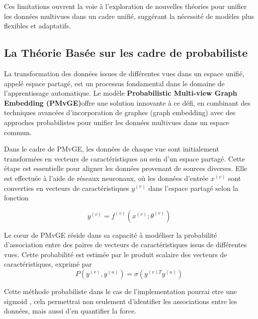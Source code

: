              Ces limitations ouvrent la voie à l'exploration de nouvelles théories pour unifier les données multivues dans un cadre unifié, suggérant la nécessité de modèles plus flexibles et adaptatifs.
                
        \subsection{ La Théorie Basée sur les cadre  de probabiliste }

            La transformation des données issues de différentes vues dans un espace unifié, appelé espace partagé, est un processus fondamental dans le domaine de l'apprentissage automatique. Le modèle \textbf{Probabilistic Multi-view Graph Embedding (PMvGE)}\cite{Okuno18}offre une solution innovante à ce défi, en combinant des techniques avancées d'incorporation de graphes (graph embedding) avec des approches probabilistes pour unifier les données multivues dans un espace commun.
            
            Dans le cadre de PMvGE, les données de chaque vue sont initialement transformées en vecteurs de caractéristiques au sein d'un espace partagé. Cette étape est essentielle pour aligner les données provenant de sources diverses. Elle est effectuée à l'aide de réseaux neuronaux, où les données d'entrée \( x^{(v)} \) sont converties en vecteurs de caractéristiques \( y^{(v)} \) dans l'espace partagé selon la fonction 
            
             \begin{equation}
               y^{(v)} = f^{(v)}(x^{(v)}; \theta^{(v)})
             \end{equation}

        
            Le cœur de PMvGE réside dans sa capacité à modéliser la probabilité d'association entre des paires de vecteurs de caractéristiques issus de différentes vues. Cette probabilité est estimée par le produit scalaire des vecteurs de caractéristiques, exprimé par 
                \begin{equation}
                       P(y^{(v)}, y^{(u)}) = \sigma(y^{(v)T} y^{(u)})
                 \end{equation}
    
            Cette méthode probabiliste dans le cas de l'implementation pourrai etre une sigmoid , cela  permettrai  non seulement d'identifier les associations entre les données, mais aussi d'en quantifier la force.
            
